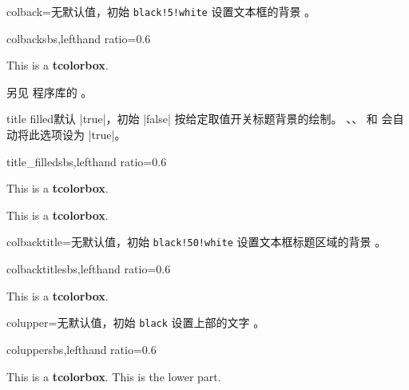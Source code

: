 \begin{docTcbKey}{colback}{=}{无默认值，初始 \texttt{black!5!white}}
  设置文本框的背景 。
\begin{exdispExample*}{colback}{sbs,lefthand ratio=0.6}
\begin{tcolorbox}[colback=red!50!white]
This is a \textbf{tcolorbox}.
\end{tcolorbox}
\end{exdispExample*}
\end{docTcbKey}

另见  程序库的 。

\begin{docTcbKey}{title filled}{}{默认 |true|，初始 |false|}
  按给定取值开关标题背景的绘制。
  、、
   和 
  会自动将此选项设为 |true|。

\begin{exdispExample*}{title_filled}{sbs,lefthand ratio=0.6}
\begin{tcolorbox}[title=My title,title filled]
This is a \textbf{tcolorbox}.
\end{tcolorbox}
\begin{tcolorbox}[title=My title,
  title filled=false]
This is a \textbf{tcolorbox}.
\end{tcolorbox}
\end{exdispExample*}
\end{docTcbKey}


\begin{docTcbKey}{colbacktitle}{=}{无默认值，初始 \texttt{black!50!white}}
  设置文本框标题区域的背景 。
\begin{exdispExample*}{colbacktitle}{sbs,lefthand ratio=0.6}
\begin{tcolorbox}[colbacktitle=red!50!white,
  title=My title,coltitle=black,
  fonttitle=\bfseries]
This is a \textbf{tcolorbox}.
\end{tcolorbox}
\end{exdispExample*}
\end{docTcbKey}



\clearpage

\begin{docTcbKey}{colupper}{=}{无默认值，初始 \texttt{black}}
  设置上部的文字 。
\begin{exdispExample*}{colupper}{sbs,lefthand ratio=0.6}
\begin{tcolorbox}[colupper=red!75!black]
This is a \textbf{tcolorbox}.
\tcblower
This is the lower part.
\end{tcolorbox}
\end{exdispExample*}
\end{docTcbKey}


